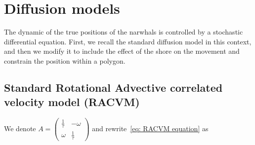 \documentclass[11pt]{article}
\newcommand {\1}{\mathbb{1}}
\theoremstyle{definition}
\theoremstyle{remark}
\theoremstyle{remark}
\begin{document}
\section{Diffusion models}

The dynamic of the true positions of the narwhals is controlled by a stochastic differential equation. First, we recall the standard diffusion model in this context, and then we modify it to include the effect of the shore on the movement and constrain the position within a polygon.


\subsection{Standard Rotational Advective correlated velocity model (RACVM)}
\label{section: RACVM}


We denote $A=\begin{pmatrix} 
	\frac{1}{\tau} & -\omega \\
	\omega & \frac{1}{\tau}
\end{pmatrix}$ and rewrite~\eqref{eq: RACVM equation} as
\end{document}
